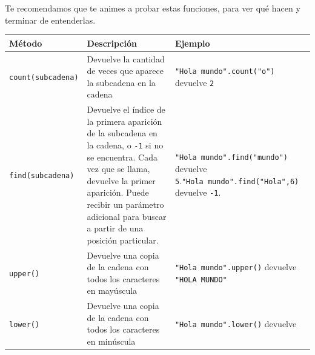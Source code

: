 \documentclass[
  letterpaper,
  DIV=11,
  numbers=noendperiod]{scrreprt}
\begin{document}
\begin{tcolorbox}[enhanced jigsaw, opacitybacktitle=0.6, toptitle=1mm, toprule=.15mm, arc=.35mm, breakable, bottomrule=.15mm, opacityback=0, leftrule=.75mm, rightrule=.15mm, title=\textcolor{quarto-callout-note-color}{\faInfo}\hspace{0.5em}{Recomendación}, left=2mm, bottomtitle=1mm, colframe=quarto-callout-note-color-frame, colback=white, titlerule=0mm, coltitle=black, colbacktitle=quarto-callout-note-color!10!white]

Te recomendamos que te animes a probar estas funciones, para ver qué
hacen y terminar de entenderlas.

\end{tcolorbox}

\begin{longtable}[]{@{}
  >{\raggedright\arraybackslash}p{}
  >{\raggedright\arraybackslash}p{}
  >{\raggedright\arraybackslash}p{}@{}}
\toprule\noalign{}
\begin{minipage}[b]{\linewidth}\raggedright
Método
\end{minipage} & \begin{minipage}[b]{\linewidth}\raggedright
Descripción
\end{minipage} & \begin{minipage}[b]{\linewidth}\raggedright
Ejemplo
\end{minipage} \\
\midrule\noalign{}
\endhead
\bottomrule\noalign{}
\endlastfoot
\texttt{count(subcadena)} & Devuelve la cantidad de veces que aparece la
subcadena en la cadena & \texttt{"Hola\ mundo".count("o")} devuelve
\texttt{2} \\
\texttt{find(subcadena)} & Devuelve el índice de la primera aparición de
la subcadena en la cadena, o \texttt{-1} si no se encuentra. Cada vez
que se llama, devuelve la primer aparición. Puede recibir un parámetro
adicional para buscar a partir de una posición particular. &
\texttt{"Hola\ mundo".find("mundo")} devuelve
\texttt{5}.\texttt{"Hola\ mundo".find("Hola",6)} devuelve
\texttt{-1}. \\
\texttt{upper()} & Devuelve una copia de la cadena con todos los
caracteres en mayúscula & \texttt{"Hola\ mundo".upper()} devuelve
\texttt{"HOLA\ MUNDO"} \\
\texttt{lower()} & Devuelve una copia de la cadena con todos los
caracteres en minúscula & \texttt{"Hola\ mundo".lower()} devuelve

\end{longtable}
\end{document}
